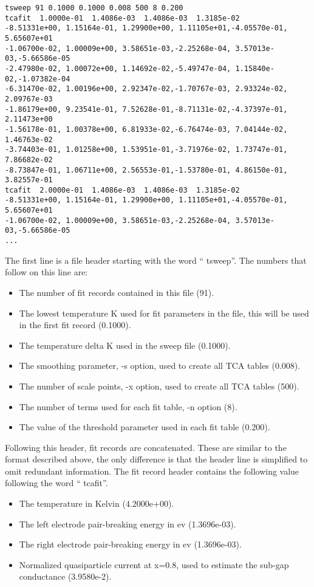 {\begin{verbatim}
tsweep 91 0.1000 0.1000 0.008 500 8 0.200
tcafit  1.0000e-01  1.4086e-03  1.4086e-03  1.3185e-02
-8.51331e+00, 1.15164e-01, 1.29900e+00, 1.11105e+01,-4.05570e-01, 5.65607e+01
-1.06700e-02, 1.00009e+00, 3.58651e-03,-2.25268e-04, 3.57013e-03,-5.66586e-05
-2.47980e-02, 1.00072e+00, 1.14692e-02,-5.49747e-04, 1.15840e-02,-1.07382e-04
-6.31470e-02, 1.00196e+00, 2.92347e-02,-1.70767e-03, 2.93324e-02, 2.09767e-03
-1.86179e+00, 9.23541e-01, 7.52628e-01,-8.71131e-02,-4.37397e-01, 2.11473e+00
-1.56178e-01, 1.00378e+00, 6.81933e-02,-6.76474e-03, 7.04144e-02, 1.46763e-02
-3.74403e-01, 1.01258e+00, 1.53951e-01,-3.71976e-02, 1.73747e-01, 7.86682e-02
-8.73847e-01, 1.06711e+00, 2.56553e-01,-1.53780e-01, 4.86150e-01, 3.82557e-01
tcafit  2.0000e-01  1.4086e-03  1.4086e-03  1.3185e-02
-8.51331e+00, 1.15164e-01, 1.29900e+00, 1.11105e+01,-4.05570e-01, 5.65607e+01
-1.06700e-02, 1.00009e+00, 3.58651e-03,-2.25268e-04, 3.57013e-03,-5.66586e-05
...
\end{verbatim}

The first line is a file header starting with the word ``{\vt
tsweep}''.  The numbers that follow on this line are:

\begin{itemize}
\item{The number of fit records contained in this file (91).}
\item{The lowest temperature K used for fit parameters in the file,
this will be used in the first fit record (0.1000).}
\item{The temperature delta K used in the sweep file (0.1000).}
\item{The smoothing parameter, {\vt -s} option, used to create all TCA
tables (0.008).}
\item{The number of scale points, {\vt -x} option, used to create all
TCA tables (500).}
\item{The number of terms used for each fit table, {\vt -n} option
(8).}
\item{The value of the threshold parameter used in each fit table
(0.200).}
\end{itemize}

Following this header, fit records are concatenated.  These are
similar to the format described above, the only difference is that the
header line is simplified to omit redundant information.  The fit
record header contains the following value following the word ``{\vt
tcafit}''.

\begin{itemize}
\item{The temperature in Kelvin (4.2000e+00).}
\item{The left electrode pair-breaking energy in ev (1.3696e-03).}
\item{The right electrode pair-breaking energy in ev (1.3696e-03).}
\item{Normalized quasiparticle current at x=0.8, used to estimate
the sub-gap conductance (3.9580e-2).}
\end{itemize}


}

